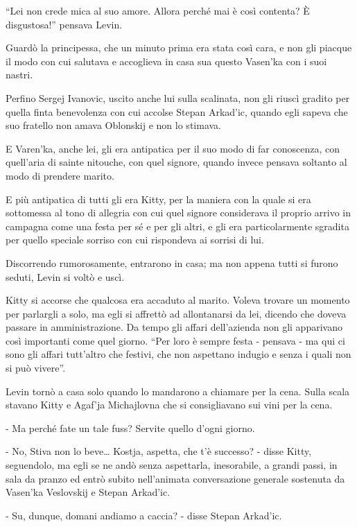 ``Lei non crede mica al suo amore. Allora perché mai è così contenta? È disgustosa!'' pensava Levin. 

Guardò la principessa, che un minuto prima era stata così cara, e non gli piacque il modo con cui salutava e accoglieva in casa sua questo Vasen'ka con i suoi nastri. 

Perfino Sergej Ivanovic, uscito anche lui sulla scalinata, non gli riuscì gradito per quella finta benevolenza con cui accolse Stepan Arkad'ic, quando egli sapeva che suo fratello non amava Oblonskij e non lo stimava. 

E Varen'ka, anche lei, gli era antipatica per il suo modo di far conoscenza, con quell'aria di sainte nitouche, con quel signore, quando invece pensava soltanto al modo di prendere marito. 

E più antipatica di tutti gli era Kitty, per la maniera con la quale si era sottomessa al tono di allegria con cui quel signore considerava il proprio arrivo in campagna come una festa per sé e per gli altri, e gli era particolarmente sgradita per quello speciale sorriso con cui rispondeva ai sorrisi di lui. 

Discorrendo rumorosamente, entrarono in casa; ma non appena tutti si furono seduti, Levin si voltò e uscì. 

Kitty si accorse che qualcosa era accaduto al marito. Voleva trovare un momento per parlargli a solo, ma egli si affrettò ad allontanarsi da lei, dicendo che doveva passare in amministrazione. Da tempo gli affari dell'azienda non gli apparivano così importanti come quel giorno. ``Per loro è sempre festa - pensava - ma qui ci sono gli affari tutt'altro che festivi, che non aspettano indugio e senza i quali non si può vivere''. 

\label{vii-5} 

Levin tornò a casa solo quando lo mandarono a chiamare per la cena. Sulla scala stavano Kitty e Agaf'ja Michajlovna che si consigliavano sui vini per la cena. 

- Ma perché fate un tale fuss? Servite quello d'ogni giorno. 

- No, Stiva non lo beve\ldots{} Kostja, aspetta, che t'è successo? - disse Kitty, seguendolo, ma egli se ne andò senza aspettarla, inesorabile, a grandi passi, in sala da pranzo ed entrò subito nell'animata conversazione generale sostenuta da Vasen'ka Veslovskij e Stepan Arkad'ic. 

- Su, dunque, domani andiamo a caccia? - disse Stepan Arkad'ic. 

